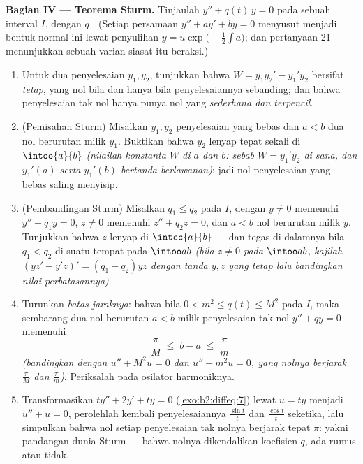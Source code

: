 \begin{problem}
\medskip
\noindent\textbf{Bagian IV --- Teorema Sturm.} Tinjaulah $y''
+ q(t)\,y = 0$ pada sebuah interval $I$, dengan $q$ . (Setiap
persamaan $y'' + ay' + by = 0$ menyusut menjadi bentuk normal ini lewat
penyulihan $y = u\exp\bigl(-\frac12\int a\bigr)$; dan
pertanyaan 21 menunjukkan sebuah varian siasat itu beraksi.)
\begin{enumerate}[resume]
  \item Untuk dua penyelesaian $y_1, y_2$, tunjukkan bahwa 
        $W = y_1y_2' - y_1'y_2$ bersifat \emph{tetap}, yang nol bila dan hanya bila
        penyelesaiannya sebanding; dan bahwa penyelesaian tak nol
        hanya punya nol yang \emph{sederhana dan terpencil}.
  \item (Pemisahan Sturm) Misalkan $y_1, y_2$ penyelesaian yang
        bebas dan $a < b$ dua nol berurutan milik $y_1$.
        Buktikan bahwa $y_2$ lenyap tepat sekali di
        $\intoo{a}{b}$ \emph{(nilailah konstanta $W$ di $a$
        dan $b$: sebab $W = y_1'y_2$ di sana, dan $y_1'(a)$ serta
        $y_1'(b)$ bertanda berlawanan)}: jadi nol penyelesaian yang
        bebas saling menyisip.
  \item (Pembandingan Sturm) Misalkan $q_1 \leq q_2$ pada $I$, dengan $y \neq
        0$ memenuhi $y'' + q_1y = 0$, $z \neq 0$ memenuhi $z'' + q_2z
        = 0$, dan $a < b$ nol berurutan milik $y$. Tunjukkan bahwa
        $z$ lenyap di $\intcc{a}{b}$ --- dan tegas di dalamnya bila
        $q_1 < q_2$ di suatu tempat pada $\intoo ab$ \emph{(bila $z \neq
        0$ pada $\intoo ab$, kajilah $(yz' - y'z)' = (q_1 -
        q_2)yz$ dengan tanda $y, z$ yang tetap lalu bandingkan
        nilai perbatasannya)}.
  \item Turunkan \emph{batas jaraknya}: bahwa bila $0 < m^2 \leq
        q(t) \leq M^2$ pada $I$, maka sembarang dua nol berurutan
        $a < b$ milik penyelesaian tak nol $y'' + qy = 0$
        memenuhi
        \[
        \frac{\pi}{M} \;\leq\; b - a \;\leq\; \frac{\pi}{m}
        \]
        \emph{(bandingkan dengan $u'' + M^2u = 0$ dan $u'' + m^2u
        = 0$, yang nolnya berjarak $\frac\pi M$ dan
        $\frac\pi m$)}. Periksalah pada osilator harmoniknya.
  \item Transformasikan $ty'' + 2y' + ty = 0$
        (\cref{exo:b2:diffeq:7}) lewat $u = ty$ menjadi $u'' + u =
        0$, perolehlah kembali penyelesaiannya $\frac{\sin t}t$ dan
        $\frac{\cos t}{t}$ seketika, lalu simpulkan bahwa
        nol setiap penyelesaian tak nolnya berjarak tepat
        $\pi$: yakni pandangan dunia Sturm --- bahwa nolnya dikendalikan
        koefisien $q$, ada rumus atau tidak.
\end{enumerate}


\end{problem}
